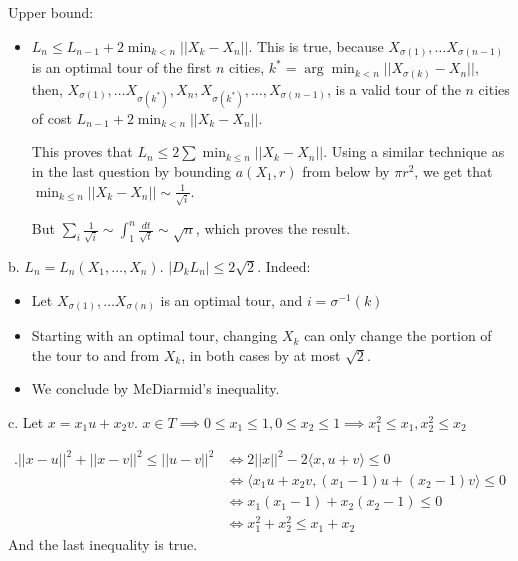 \documentclass[11pt]{article}
\begin{document}
Upper bound:
\begin{itemize}
\item \(L_n \le L_{n-1} + 2 \min_{k < n} ||X_k - X_n||\). This is true, because \(X_{\sigma(1)}, \ldots X_{\sigma(n-1)}\) is an optimal tour of the first \(n\) cities, \(k^* = \arg \min_{k < n} ||X_{\sigma(k)} - X_n||\), then, \(X_{\sigma(1)}, \ldots X_{\sigma(k^*)}, X_n, X_{\sigma(k^*)}, \ldots, X_{\sigma(n-1)}\), is a valid tour of the \(n\) cities of cost \(L_{n-1} + 2 \min_{k < n} ||X_k - X_n||\).

This proves that \(L_n \le 2 \sum \min_{k \le n} ||X_k - X_n||\). Using a similar technique as in the last question by bounding \(a(X_1, r)\) from below by \(\pi r^2\), we get that \(\min_{k \le n} ||X_k - X_n|| \sim \frac1{\sqrt i}\).

But \(\sum_i \frac1{\sqrt i} \sim \int_1^n \frac{dt}{\sqrt t} \sim \sqrt{n}\), which proves the result.
\end{itemize}
b.
\(L_n = L_n(X_1, \ldots, X_n)\). \(|D_k L_n| \le 2\sqrt{2}\). Indeed:
\begin{itemize}
\item Let \(X_{\sigma(1)}, \ldots X_{\sigma(n)}\) is an optimal tour, and \(i = \sigma^{-1}(k)\)
\item Starting with an optimal tour, changing \(X_k\) can only change the portion of the tour to and from \(X_k\), in both cases by at most \(\sqrt{2}\).
\item We conclude by McDiarmid's inequality.
\end{itemize}

c.
Let \(x = x_1 u + x_2 v\).
\(x \in T \implies 0\le x_1 \le 1, 0 \le x_2 \le 1 \implies x_1^2 \le x_1, x_2^2 \le x_2\)

\begin{align*}
.||x - u||^2 + ||x - v||^2 \le ||u - v||^2
&\iff 2||x||^2 - 2\langle x, u+v\rangle \le 0
\\&\iff \langle x_1 u + x_2 v, (x_1-1) u + (x_2 - 1) v \rangle \le 0
\\&\iff x_1(x_1 - 1) + x_2(x_2 - 1) \le 0
\\&\iff x_1^2 + x_2^2 \le x_1 + x_2
\end{align*}
And the last inequality is true.
\end{document}
